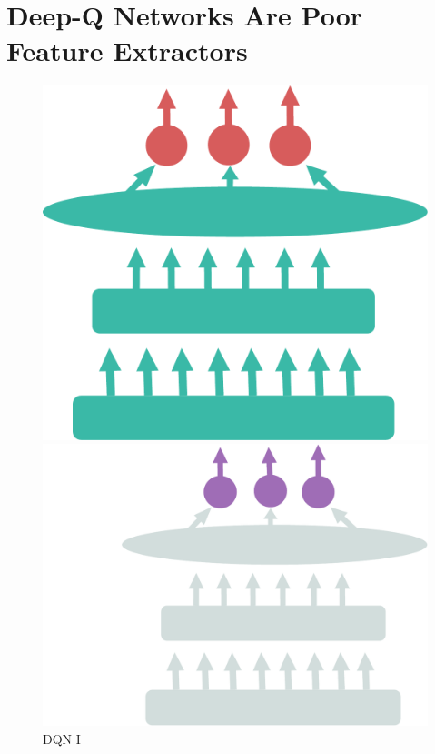 

\begin{table}
	
\end{table}


\section{Deep-Q Networks Are Poor Feature Extractors}

\begin{figure}[ht]
	\centering
\begin{minipage}[b]{0.32\linewidth}
\centering
\includegraphics[width=\textwidth]{./Images/Chapter08/pre_trained_network.pdf}
\caption{DQN I}
\label{fig:net1}
\end{minipage}
\hspace{0.5cm}
\begin{minipage}[b]{0.4\linewidth}
\centering
\includegraphics[width=\textwidth]{./Images/Chapter08/only_head.pdf}

\end{minipage}
\end{figure}
